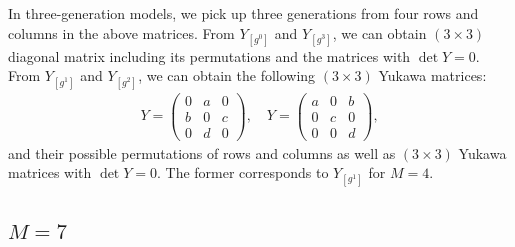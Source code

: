 \documentclass[a4paper,11pt]{article}
\numberwithin{equation}{section}
\begin{document}
In three-generation models, we pick up 
three generations from four rows and columns 
in the above matrices.
From $Y_{[g^0]}$ and $Y_{[g^3]}$, 
we can obtain $(3\times 3)$ diagonal matrix including its permutations and 
the matrices with $\det Y=0$.
From $Y_{[g^1]}$ and $Y_{[g^2]}$, 
we can obtain the following $(3 \times 3)$ 
Yukawa matrices:
\begin{align}
    Y=
    \begin{pmatrix}
        0 & a & 0 \\
        b & 0 & c \\
        0 & d & 0
    \end{pmatrix}, \quad
    Y= 
    \begin{pmatrix}
    a & 0 & b \\
    0 & c & 0 \\
    0 & 0 & d
    \end{pmatrix}
    ,
\end{align}
and their possible permutations of rows and columns 
as well as $(3 \times 3)$ Yukawa matrices 
with $\det Y=0$.
The former corresponds to $Y_{[g^1]}$ for $M=4$.






\subsection{$M=7$}
\end{document}
